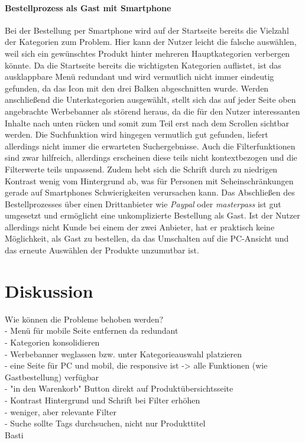 \documentclass[	12pt, 
				a4paper, 
				BCOR=10mm, %
				DIV=12, 
				parskip=half, %
				headings=small, %
				twoside, %
				ngerman,
				bibliography=totoc,index=totoc, listof=totoc,
				numbers=noendperiod
				]{scrbook} %
\theoremstyle{plain}%
\theoremstyle{definition}
\theoremstyle{remark}
\begin{document}
\paragraph{Bestellprozess als Gast mit Smartphone} Bei der Bestellung per Smartphone wird auf der Startseite bereits die Vielzahl der Kategorien zum Problem. Hier kann der Nutzer leicht die falsche auswählen, weil sich ein gewünschtes Produkt hinter mehreren Hauptkategorien verbergen könnte. Da die Startseite bereits die wichtigsten Kategorien auflistet, ist das ausklappbare Menü redundant und wird vermutlich nicht immer eindeutig gefunden, da das Icon mit den drei Balken abgeschnitten wurde. Werden anschließend die Unterkategorien ausgewählt, stellt sich das auf jeder Seite oben angebrachte Werbebanner als störend heraus, da die für den Nutzer interessanten Inhalte nach unten rücken und somit zum Teil erst nach dem Scrollen sichtbar werden. Die Suchfunktion wird hingegen vermutlich gut gefunden, liefert allerdings nicht immer die erwarteten Suchergebnisse. Auch die Filterfunktionen sind zwar hilfreich, allerdings erscheinen diese teils nicht kontextbezogen und die Filterwerte teils unpassend. Zudem hebt sich die Schrift durch zu niedrigen Kontrast wenig vom Hintergrund ab, was für Personen mit Seheinschränkungen gerade auf Smartphones Schwierigkeiten verursachen kann. Das Abschließen des Bestellprozesses über einen Drittanbieter wie \textit{Paypal} oder \textit{masterpass} ist gut umgesetzt und ermöglicht eine unkomplizierte Bestellung als Gast. Ist der Nutzer allerdings nicht Kunde bei einem der zwei Anbieter, hat er praktisch keine Möglichkeit, als Gast zu bestellen, da das Umschalten auf die PC-Ansicht und das erneute Auswählen der Produkte unzumutbar ist.

\section{Diskussion}
Wie können die Probleme behoben werden?\\
- Menü für mobile Seite entfernen da redundant\\
- Kategorien konsolidieren\\
- Werbebanner weglassen bzw. unter Kategorieauswahl platzieren\\
- eine Seite für PC und mobil, die responsive ist -> alle Funktionen (wie Gastbestellung) verfügbar\\
- "in den Warenkorb" Button direkt auf Produktübersichtsseite\\
- Kontrast Hintergrund und Schrift bei Filter erhöhen\\
- weniger, aber relevante Filter\\
- Suche sollte Tags durchsuchen, nicht nur Produkttitel\\
Basti
\end{document}
